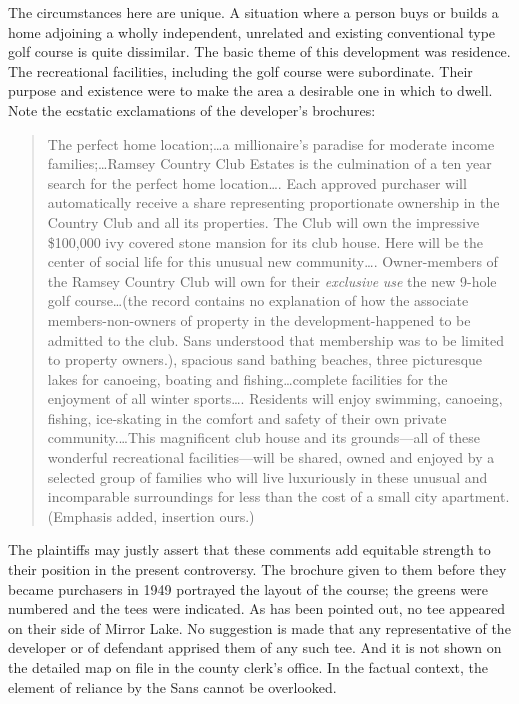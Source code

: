 The circumstances here are unique. A situation where a person buys or builds a
home adjoining a wholly independent, unrelated and existing conventional type
golf course is quite dissimilar. The basic theme of this development was
residence. The recreational facilities, including the golf course were
subordinate. Their purpose and existence were to make the area a desirable one
in which to dwell. Note the ecstatic exclamations of the developer's brochures:
\begin{quote}
The perfect home location;\ldots a millionaire's paradise for moderate income
families;\ldots Ramsey Country Club Estates is the culmination of a ten year
search for the perfect home location\ldots. Each approved purchaser will
automatically receive a share representing proportionate ownership in the
Country Club and all its properties. The Club will own the impressive \$100,000
ivy covered stone mansion for its club house. Here will be the center of social
life for this unusual new community\ldots. Owner-members of the Ramsey Country
Club will own for their \textit{exclusive} \textit{use} the new 9-hole golf
course\ldots (the record contains no explanation of how the associate
members-non-owners of property in the development-happened to be admitted to the
club. Sans understood that membership was to be limited to property owners.),
spacious sand bathing beaches, three picturesque lakes for canoeing, boating and
fishing\ldots complete facilities for the enjoyment of all winter sports\ldots.
Residents will enjoy swimming, canoeing, fishing, ice-skating in the comfort and
safety of their own private community.\ldots This magnificent club house and its
grounds---all of these wonderful recreational facilities---will be shared, owned
and
enjoyed by a selected group of families who will live luxuriously in these
unusual and incomparable surroundings for less than the cost of a small city
apartment. (Emphasis added, insertion ours.)
\end{quote}

The plaintiffs may justly assert that these comments add equitable strength to
their position in the present controversy. The brochure given to them before
they became purchasers in 1949 portrayed the layout of the course; the greens
were numbered and the tees were indicated. As has been pointed out, no tee
appeared on their side of Mirror Lake. No suggestion is made that any
representative of the developer or of defendant apprised them of any such tee.
And it is not shown on the detailed map on file in the county clerk's office. In
the factual context, the element of reliance by the Sans cannot be overlooked.

